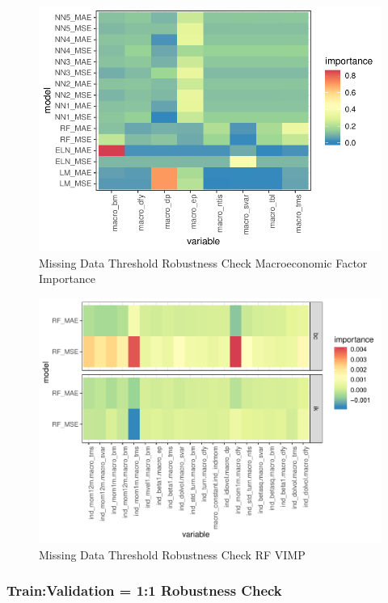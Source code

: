 \documentclass[11pt, a4paper, table]{article}
\begin{document}
\begin{figure}
	\includegraphics[]{../Results/empirical_missing_threshold/empirical_sample_all_vi_macro.pdf}
	\caption{Missing Data Threshold Robustness Check Macroeconomic Factor Importance}
\end{figure}


\begin{figure}
	\includegraphics[]{../Results/empirical_missing_threshold/empirical_vimp.pdf}
	\caption{Missing Data Threshold Robustness Check RF VIMP}
\end{figure}

\FloatBarrier
\subsubsection{Train:Validation = 1:1 Robustness Check}
\end{document}
